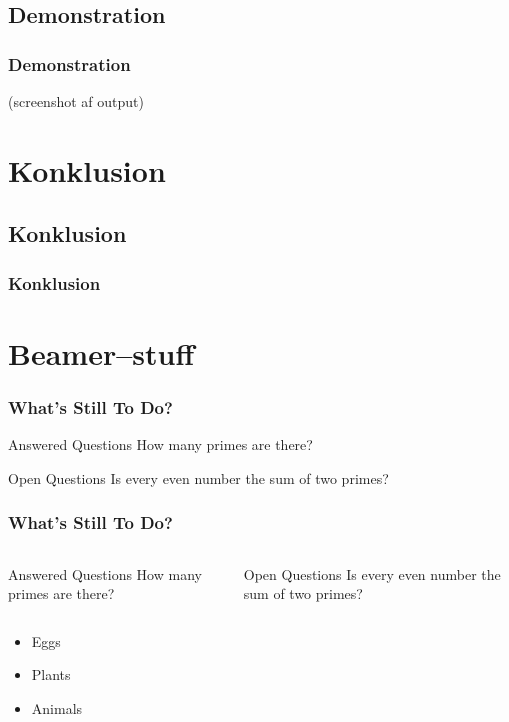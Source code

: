 \documentclass{beamer}
\begin{document}
\subsection{Demonstration}
\begin{frame}
  \frametitle{Demonstration}
  (screenshot af output)

\end{frame}


\section{Konklusion}
\subsection{Konklusion}
\begin{frame}
  \frametitle{Konklusion}

\end{frame}



\section{Beamer--stuff}
\begin{frame}
  \frametitle{What's Still To Do?}
  \begin{block}{Answered Questions}
    How many primes are there?
  \end{block}
  \pause
  \begin{block}{Open Questions}
    Is every even number the sum of two primes?
  \end{block}
\end{frame}

\begin{frame}
  \frametitle{What's Still To Do?}
  \begin{columns}[t]
      \begin{block}{Answered Questions}
        How many primes are there?
      \end{block}
      \pause
      \begin{block}{Open Questions}
        Is every even number the sum of two primes?
      \end{block}
  \end{columns}
\end{frame}

\begin{frame}
  \begin{itemize}
  \item<1-> Eggs
  \item<2-> Plants
  \item<3-> Animals
  \end{itemize}
\end{frame}
\end{document}

